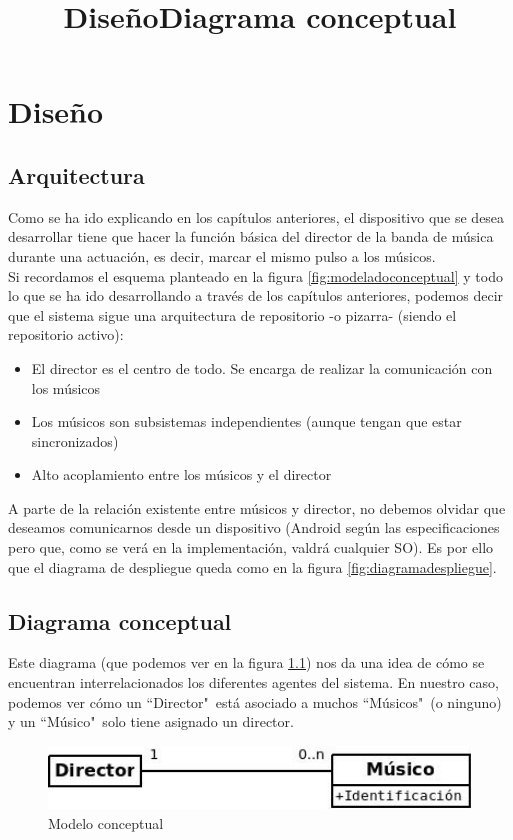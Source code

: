 \chapter{Diseño}
\title{Diseño}
\label{cap:Diseno}

\section{Arquitectura}
Como se ha ido explicando en los capítulos anteriores, el dispositivo que se desea desarrollar
tiene que hacer la función básica del director de la banda de música durante una actuación,
es decir, marcar el mismo pulso a los músicos.\\

Si recordamos el esquema planteado en la figura \ref{fig:modeladoconceptual} y todo lo
que se ha ido desarrollando a través de los capítulos anteriores, podemos decir
que el sistema sigue una arquitectura de repositorio -o pizarra- (siendo el repositorio activo):

\begin{itemize}
  \item El director es el centro de todo. Se encarga de realizar la comunicación con los músicos
  \item Los músicos son subsistemas independientes (aunque tengan que estar sincronizados)
  \item Alto acoplamiento entre los músicos y el director
\end{itemize}

A parte de la relación existente entre músicos y director, no debemos olvidar que
deseamos comunicarnos desde un dispositivo (Android según las especificaciones pero que,
como se verá en la implementación, valdrá cualquier SO). Es por ello que el diagrama
de despliegue queda como en la figura \ref{fig:diagramadespliegue}.\\

\section{Diagrama conceptual}
\title{Diagrama conceptual}
Este diagrama (que podemos ver en la figura \ref{fig:modeloconceptual})
nos da una idea de cómo se encuentran interrelacionados los diferentes
agentes del sistema. En nuestro caso, podemos ver cómo un ``Director"\ está asociado
a muchos ``Músicos"\ (o ninguno) y un ``Músico"\ solo tiene asignado un director.\\


\begin{figure}[!htb]
\centering
\includegraphics[width=1\textwidth]{./imagenes/modeloconceptual}
\caption{Modelo conceptual} \label{fig:modeloconceptual}
\end{figure}

